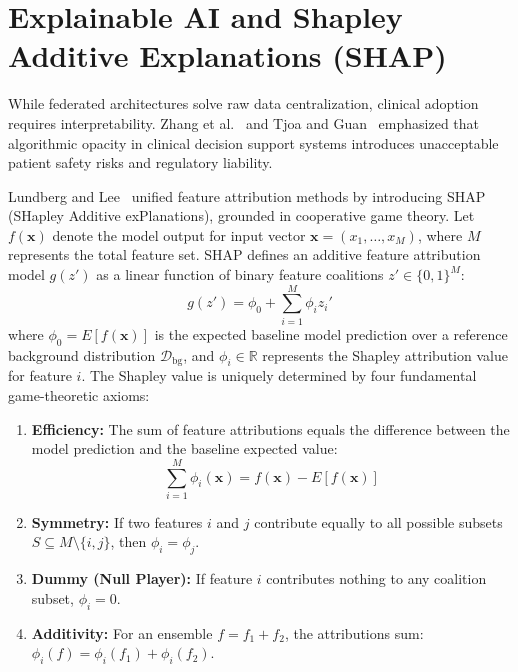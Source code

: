 \documentclass[12pt,a4paper,oneside]{report}
\begin{document}
\section{Explainable AI and Shapley Additive Explanations (SHAP)}
While federated architectures solve raw data centralization, clinical adoption requires interpretability. Zhang et al.~\cite{zhang2021survey} and Tjoa and Guan~\cite{tjoa2021survey} emphasized that algorithmic opacity in clinical decision support systems introduces unacceptable patient safety risks and regulatory liability.

Lundberg and Lee~\cite{lundberg2017unified} unified feature attribution methods by introducing SHAP (SHapley Additive exPlanations), grounded in cooperative game theory. Let $f(\mathbf{x})$ denote the model output for input vector $\mathbf{x} = (x_1, \dots, x_M)$, where $M$ represents the total feature set. SHAP defines an additive feature attribution model $g(z')$ as a linear function of binary feature coalitions $z' \in \{0, 1\}^M$:
\begin{equation}
    g(z') = \phi_0 + \sum_{i=1}^{M} \phi_i z_i'
    \label{eq:shap_additive}
\end{equation}
where $\phi_0 = E[f(\mathbf{x})]$ is the expected baseline model prediction over a reference background distribution $\mathcal{D}_{\text{bg}}$, and $\phi_i \in \mathbb{R}$ represents the Shapley attribution value for feature $i$. The Shapley value is uniquely determined by four fundamental game-theoretic axioms:

\begin{enumerate}
    \item \textbf{Efficiency:} The sum of feature attributions equals the difference between the model prediction and the baseline expected value:
    \begin{equation}
        \sum_{i=1}^{M} \phi_i(\mathbf{x}) = f(\mathbf{x}) - E[f(\mathbf{x})]
        \label{eq:efficiency}
    \end{equation}
    \item \textbf{Symmetry:} If two features $i$ and $j$ contribute equally to all possible subsets $S \subseteq M \setminus \{i, j\}$, then $\phi_i = \phi_j$.
    \item \textbf{Dummy (Null Player):} If feature $i$ contributes nothing to any coalition subset, $\phi_i = 0$.
    \item \textbf{Additivity:} For an ensemble $f = f_1 + f_2$, the attributions sum: $\phi_i(f) = \phi_i(f_1) + \phi_i(f_2)$.
\end{enumerate}
\end{document}
